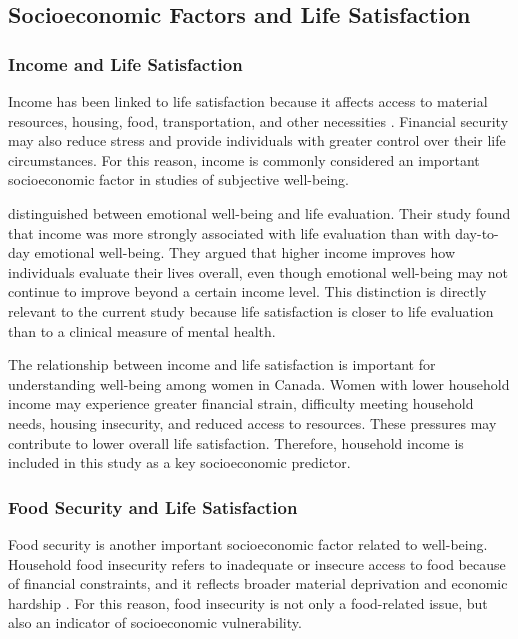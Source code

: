 \documentclass[12pt]{article}
\begin{document}
\subsection{Socioeconomic Factors and Life Satisfaction}
\subsubsection{Income and Life Satisfaction}

Income has been linked to life satisfaction because it affects access to material resources, housing, food, transportation, and other necessities \citep{kahneman2010}. Financial security may also reduce stress and provide individuals with greater control over their life circumstances. For this reason, income is commonly considered an important socioeconomic factor in studies of subjective well-being.

\citet{kahneman2010} distinguished between emotional well-being and life evaluation. Their study found that income was more strongly associated with life evaluation than with day-to-day emotional well-being. They argued that higher income improves how individuals evaluate their lives overall, even though emotional well-being may not continue to improve beyond a certain income level. This distinction is directly relevant to the current study because life satisfaction is closer to life evaluation than to a clinical measure of mental health.

The relationship between income and life satisfaction is important for understanding well-being among women in Canada. Women with lower household income may experience greater financial strain, difficulty meeting household needs, housing insecurity, and reduced access to resources. These pressures may contribute to lower overall life satisfaction. Therefore, household income is included in this study as a key socioeconomic predictor.

\subsubsection{Food Security and Life Satisfaction}

Food security is another important socioeconomic factor related to well-being. Household food insecurity refers to inadequate or insecure access to food because of financial constraints, and it reflects broader material deprivation and economic hardship \citep{tarasuk2023}. For this reason, food insecurity is not only a food-related issue, but also an indicator of socioeconomic vulnerability.
\end{document}

